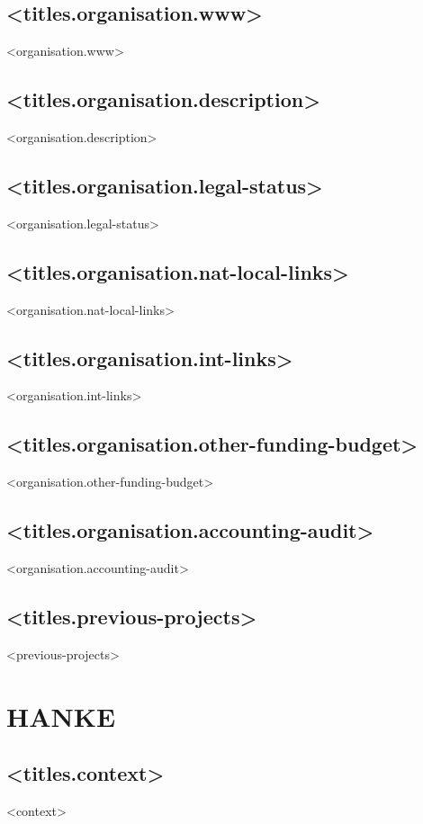 \documentclass[twoside,a4paper]{article}
\begin{document}
		\subsection*{<titles.organisation.www>}
		    <organisation.www>
		
		\subsection*{<titles.organisation.description>}
		    <organisation.description>
		
		\subsection*{<titles.organisation.legal-status>}
		    <organisation.legal-status>
		
		\subsection*{<titles.organisation.nat-local-links>}
		    <organisation.nat-local-links>
		
		\subsection*{<titles.organisation.int-links>}
		    <organisation.int-links>
		
		\subsection*{<titles.organisation.other-funding-budget>}
		    <organisation.other-funding-budget>
		
		\subsection*{<titles.organisation.accounting-audit>}
		    <organisation.accounting-audit>
		
		\subsection*{<titles.previous-projects>}
		    <previous-projects>
		
		\newpage		
		\section{HANKE}
		\subsection*{<titles.context>}
		    <context>
\end{document}
